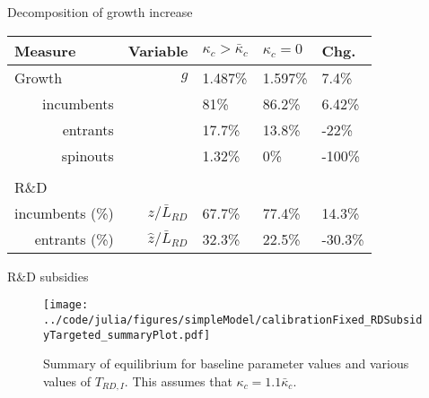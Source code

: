 \documentclass[english,usenames,dvipsnames]{beamer}
\begin{document}
\begin{frame}{Decomposition of growth increase}\label{decomposition_growth_increase}
	\hyperlink{reducing_kappa_c_table}{}
	\begin{table}
		\centering
		\footnotesize
		\begin{tabular}{lrlll}
			\toprule \toprule
			Measure & Variable & $\kappa_c > \bar{\kappa}_c$ & $\kappa_c = 0$ & Chg. \tabularnewline
			\midrule
			Growth & $g$ & 1.487\% & 1.597\% & 7.4\% \tabularnewline
			\multicolumn{1}{r}{incumbents} &  & 81\% & 86.2\% & 6.42\% \tabularnewline
			\multicolumn{1}{r}{entrants} &  & 17.7\% & 13.8\% & -22\% \tabularnewline
			\multicolumn{1}{r}{spinouts} &  & 1.32\% & 0\% & -100\% \tabularnewline
			\tabularnewline
			R\&D & & & & 
			\tabularnewline
			\multicolumn{1}{r}{incumbents (\%)}  & $z / \bar{L}_{RD}$ & 67.7\% & 77.4\% & 14.3\% \tabularnewline 
			
			\multicolumn{1}{r}{entrants (\%)}  & $\hat{z} / \bar{L}_{RD}$ & 32.3\% & 22.5\% & -30.3\% \tabularnewline
			\bottomrule
		\end{tabular}
	\end{table}
\end{frame}

\begin{frame}{R\&D subsidies} \label{plots:oi_rd_subsidies} 
	\hyperlink{OI_RDsubsidy_table}{}
	\begin{figure}[]
		\texttt{[image: ../code/julia/figures/simpleModel/calibrationFixed\_RDSubsidyTargeted\_summaryPlot.pdf]}
		\caption{Summary of equilibrium for baseline parameter values and various values of $T_{RD,I}$. This assumes that $\kappa_c = 1.1 \bar{\kappa}_c$.}
		\label{calibration_OI_RDSubsidy_summaryPlot}
	\end{figure}
\end{frame}
\end{document}
